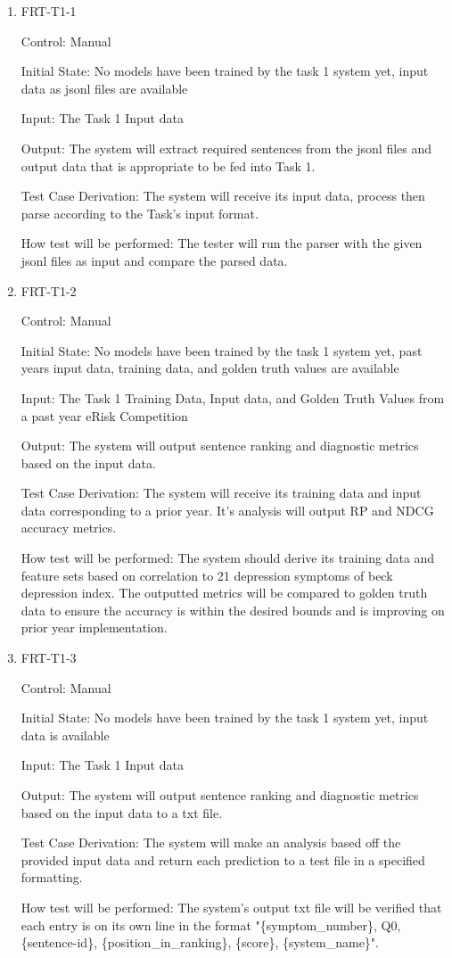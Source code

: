 \documentclass[12pt, titlepage]{article}
\begin{document}
\begin{enumerate}

\item{FRT-T1-1\\}

Control: Manual

Initial State: No models have been trained by the task 1 system yet, input data as jsonl files are available

Input: The Task 1 Input data

Output: The system will extract required sentences from the jsonl files and output data that is appropriate to be fed into Task 1.

Test Case Derivation: The system will receive its input data, process then parse according to the Task's input format.

How test will be performed: The tester will run the parser with the given jsonl files as input and compare the parsed data.

\item{FRT-T1-2\\}

Control: Manual

Initial State: No models have been trained by the task 1 system yet, past years input data, training data, and golden truth values are available

Input: The Task 1 Training Data, Input data, and Golden Truth Values from a past year eRisk Competition

Output: The system will output sentence ranking and diagnostic metrics based on the input data. 

Test Case Derivation: The system will receive its training data and input data corresponding to a prior year. It's analysis will output RP and NDCG accuracy metrics.

How test will be performed: The system should derive its training data and feature sets based on correlation to 21 depression symptoms of beck depression index. The outputted metrics will be compared to golden truth data to ensure the accuracy is within the desired bounds and is improving on prior year implementation.

\item{FRT-T1-3\\}

Control: Manual

Initial State: No models have been trained by the task 1 system yet, input data is available

Input: The Task 1 Input data

Output: The system will output sentence ranking and diagnostic metrics based on the input data to a txt file.

Test Case Derivation: The system will make an analysis based off the provided input data and return each prediction to a test file in a specified formatting.

How test will be performed: The system's output txt file will be verified that each entry is on its own line in the format "\{symptom\_number\}, Q0, \{sentence-id\}, \{position\_in\_ranking\}, \{score\}, \{system\_name\}".

\end{enumerate}
\end{document}
